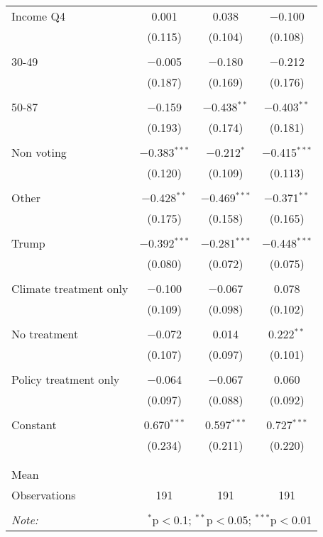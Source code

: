 \begin{tabular}{@{\extracolsep{5pt}}lccc}
 Income Q4 & 0.001 & 0.038 & $-$0.100 \\ 
  & (0.115) & (0.104) & (0.108) \\ 
  & & & \\ 
 30-49 & $-$0.005 & $-$0.180 & $-$0.212 \\ 
  & (0.187) & (0.169) & (0.176) \\ 
  & & & \\ 
 50-87 & $-$0.159 & $-$0.438$^{**}$ & $-$0.403$^{**}$ \\ 
  & (0.193) & (0.174) & (0.181) \\ 
  & & & \\ 
 Non voting & $-$0.383$^{***}$ & $-$0.212$^{*}$ & $-$0.415$^{***}$ \\ 
  & (0.120) & (0.109) & (0.113) \\ 
  & & & \\ 
 Other & $-$0.428$^{**}$ & $-$0.469$^{***}$ & $-$0.371$^{**}$ \\ 
  & (0.175) & (0.158) & (0.165) \\ 
  & & & \\ 
 Trump & $-$0.392$^{***}$ & $-$0.281$^{***}$ & $-$0.448$^{***}$ \\ 
  & (0.080) & (0.072) & (0.075) \\ 
  & & & \\ 
 Climate treatment only & $-$0.100 & $-$0.067 & 0.078 \\ 
  & (0.109) & (0.098) & (0.102) \\ 
  & & & \\ 
 No treatment & $-$0.072 & 0.014 & 0.222$^{**}$ \\ 
  & (0.107) & (0.097) & (0.101) \\ 
  & & & \\ 
 Policy treatment only & $-$0.064 & $-$0.067 & 0.060 \\ 
  & (0.097) & (0.088) & (0.092) \\ 
  & & & \\ 
 Constant & 0.670$^{***}$ & 0.597$^{***}$ & 0.727$^{***}$ \\ 
  & (0.234) & (0.211) & (0.220) \\ 
  & & & \\ 
\hline \\[-1.8ex] 
Mean &  &  &  \\ 
Observations & 191 & 191 & 191 \\ 
\hline 
\hline \\[-1.8ex] 
\textit{Note:}  & \multicolumn{3}{r}{$^{*}$p$<$0.1; $^{**}$p$<$0.05; $^{***}$p$<$0.01} \\ 
\end{tabular} 
